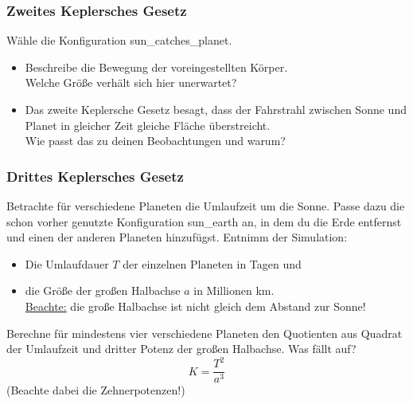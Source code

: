 \documentclass{scrartcl}
\begin{document}
        \subsubsection*{Zweites Keplersches Gesetz}
        \noindent Wähle die Konfiguration \glqq sun\_catches\_planet\grqq{}.
        \begin{itemize}
            \item Beschreibe die Bewegung der voreingestellten Körper.\\Welche Größe verhält sich hier unerwartet?
            \item Das zweite Keplersche Gesetz besagt, dass der Fahrstrahl zwischen Sonne und Planet in gleicher Zeit gleiche Fläche überstreicht.\\Wie passt das zu deinen Beobachtungen und warum?
        \end{itemize}

        \newpage

        \subsubsection*{Drittes Keplersches Gesetz}
        Betrachte für verschiedene Planeten die Umlaufzeit um die Sonne. Passe dazu die schon vorher genutzte Konfiguration \glqq sun\_earth\grqq{} an, in dem du die Erde entfernst und einen der anderen Planeten hinzufügst. Entnimm der Simulation:
        \begin{itemize}
            \item Die Umlaufdauer $T$ der einzelnen Planeten in Tagen und
            \item die Größe der großen Halbachse $a$ in Millionen km. \\
            \underline{Beachte:} die große Halbachse ist nicht gleich dem Abstand zur Sonne!
        \end{itemize}

        \noindent Berechne für mindestens vier verschiedene Planeten den Quotienten aus Quadrat der Umlaufzeit und dritter Potenz der großen Halbachse. Was fällt auf?
        \begin{equation*}
            K = \frac{T^ 2}{a^3}
        \end{equation*}
        (\noindent Beachte dabei die Zehnerpotenzen!)\\
\end{document}
